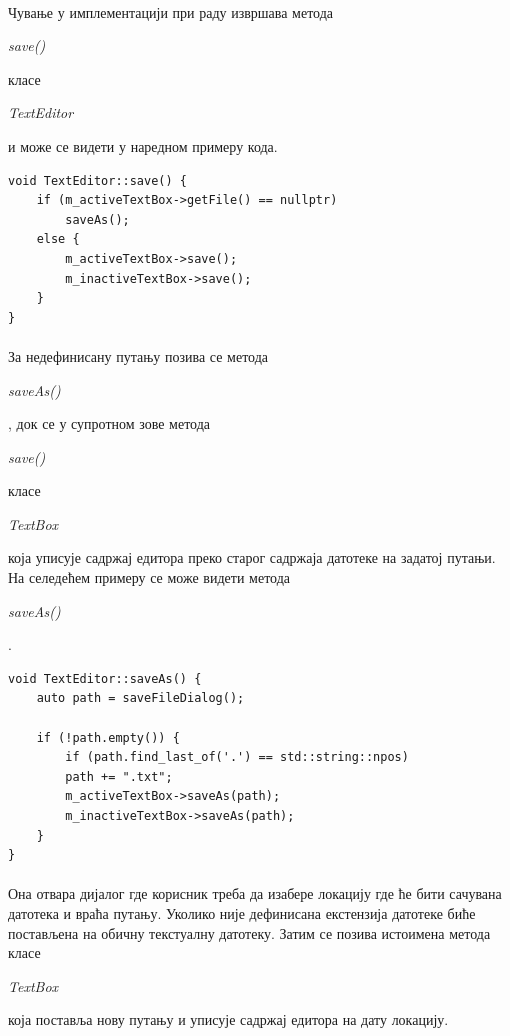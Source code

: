 \documentclass[12pt,oneside]{memoir}
\begin{document}
\paragraph{}
Чување у имплементацији при раду извршава метода
\begin{latinica}\textit{save()}\end{latinica} класе
\begin{latinica}\textit{TextEditor}\end{latinica} и може се видети у наредном
примеру кода.

\begin{verbatim}
void TextEditor::save() {
	if (m_activeTextBox->getFile() == nullptr)
		saveAs();
	else {
		m_activeTextBox->save();
		m_inactiveTextBox->save();
	}
}
\end{verbatim}

\paragraph{}
За недефинисану путању позива се метода
\begin{latinica}\textit{saveAs()}\end{latinica}, док се у супротном
зове метода \begin{latinica}\textit{save()}\end{latinica} класе
\begin{latinica}\textit{TextBox}\end{latinica} која уписује садржај
едитора преко старог садржаја датотеке на задатој путањи. На селедећем
примеру се може видети метода \begin{latinica}\textit{saveAs()}\end{latinica}.

\begin{verbatim}
void TextEditor::saveAs() {
	auto path = saveFileDialog();
	
	if (!path.empty()) {
		if (path.find_last_of('.') == std::string::npos)
		path += ".txt";
		m_activeTextBox->saveAs(path);
		m_inactiveTextBox->saveAs(path);
	}
}
\end{verbatim}

\paragraph{}
Она отвара дијалог где корисник треба да изабере локацију где ће бити сачувана
датотека и враћа путању. Уколико није дефинисана екстензија датотеке биће
постављена на обичну текстуалну датотеку. Затим се позива истоимена метода
класе \begin{latinica}\textit{TextBox}\end{latinica} која поставља нову путању
и уписује садржај едитора на дату локацију.
\end{document}
